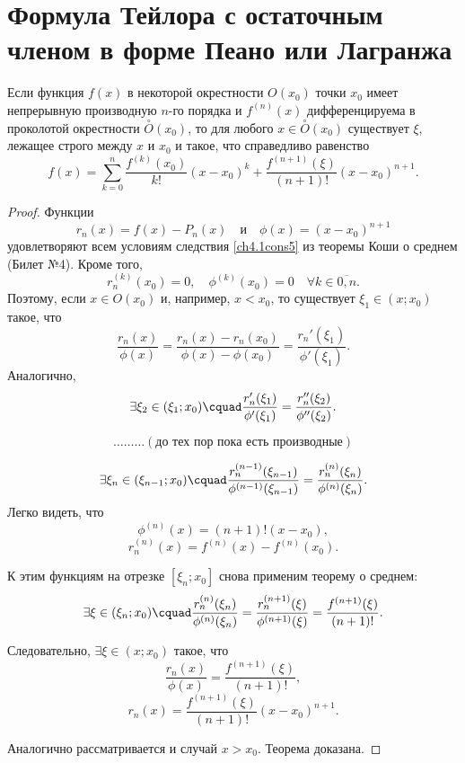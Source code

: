 
\section{Формула Тейлора с остаточным членом в форме Пеано или Лагранжа}
	
\begin{thm} \label{ch5.thm1}
Если функция $f(x)$ в некоторой окрестности $O(x_0)$ точки $x_0$ имеет непрерывную производную $n$-го порядка и $f^{(n)}(x)$ дифференцируема в проколотой окрестности $\overset{\circ}{O}(x_0)$, то для любого
$x \in \overset{\circ}{O}(x_0)$ существует $\xi$, лежащее строго между $x$ и $x_0$ и такое, что справедливо равенство
\begin{equation} \label{ch5.1eq1}
f(x) = \sum_{k = 0}^{n} \frac{f^{(k)}(x_0)}{k!}(x - x_0)^k + \frac{f^{(n + 1)}(\xi)}{(n + 1)!}(x - x_0)^{n + 1}.
\end{equation}
\end{thm}

\begin{proof}
Функции $$r_n(x) = f(x) - P_n(x) \quad \text{и} \quad \phi(x) = (x - x_0)^{n + 1}$$ удовлетворяют всем условиям следствия \ref{ch4.1cons5} из теоремы Коши о среднем (Билет №4). Кроме того, 
$$
r_n^{(k)}(x_0) = 0, \quad \phi^{(k)}(x_0) = 0 \quad \forall k \in \overline{0,n}.
$$ 
Поэтому, если $x \in O(x_0)$ и, например, $x < x_0$, то существует $\xi_1 \in (x; x_0)$ такое, что
$$
\frac{r_n(x)}{\phi(x)} = \frac{r_n(x) - r_n(x_0)}{\phi(x) - \phi(x_0)} = \frac{r_n'(\xi_1)}{\phi'(\xi_1)}.
$$
Аналогично,
$$
\exists \xi_2 \in (\xi_1; x_0)\cquad \frac{r_n'(\xi_1)}{\phi'(\xi_1)} = \frac{r_n''(\xi_2)}{\phi''(\xi_2)}.
$$

$$\ldots\ldots\ldots (\text{до тех пор пока есть производные})$$

$$
\exists \xi_n \in (\xi_{n - 1}; x_0) \cquad \frac{r_n^{(n - 1)}(\xi_{n - 1})}{\phi^{(n - 1)}(\xi_{n - 1})} = \frac{r_n^{(n)}(\xi_{n})}{\phi^{(n)}(\xi_{n})}.
$$
Легко видеть, что 
$$
\phi^{(n)}(x) = (n + 1)!(x - x_0),
$$
$$
r_n^{(n)}(x) = f^{(n)}(x) - f^{(n)}(x_0).
$$

К этим функциям на отрезке $[\xi_n; x_0]$ снова применим теорему о среднем:
$$
\exists \xi \in (\xi_n; x_0)\cquad \frac{r_n^{(n)}(\xi_{n})}{\phi^{(n)}(\xi_{n})} = \frac{r_n^{(n + 1)}(\xi)}{\phi^{(n + 1)}(\xi)} = \frac{f^{(n + 1)}(\xi)}{(n + 1)!}.
$$

Следовательно, $\exists \xi \in (x; x_0)$ такое, что
$$
\frac{r_n(x)}{\phi(x)} = \frac{f^{(n + 1)}(\xi)}{(n + 1)!},
$$
$$
r_n(x) = \frac{f^{(n + 1)}(\xi)}{(n + 1)!}(x - x_0)^{n + 1}.
$$

Аналогично рассматривается и случай $x > x_0$. Теорема доказана.
\end{proof}


